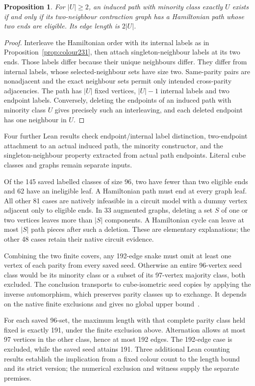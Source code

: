 \documentclass[11pt,a4paper]{article}
\newtheorem{proposition}[theorem]{Proposition}
\theoremstyle{definition}
\theoremstyle{remark}
\begin{document}
\begin{proposition}\label{prop:minority232}
For $|U|\ge2$, an induced path with minority class exactly $U$ exists if
and only if its two-neighbour contraction graph has a Hamiltonian path
whose two ends are eligible. Its edge length is $2|U|$.
\end{proposition}
\begin{proof}
Interleave the Hamiltonian order with its internal labels as in
Proposition~\ref{prop:colour231}, then attach singleton-neighbour labels
at its two ends. Those labels differ because their unique neighbours
differ. They differ from internal labels, whose selected-neighbour sets
have size two. Same-parity pairs are nonadjacent and the exact neighbour
sets permit only intended cross-parity adjacencies. The path has $|U|$
fixed vertices, $|U|-1$ internal labels and two endpoint labels.
Conversely, deleting the endpoints of an induced path with minority
class $U$ gives precisely such an interleaving, and each deleted endpoint
has one neighbour in $U$.
\end{proof}

Four further Lean results check endpoint/internal label distinction,
two-endpoint attachment to an actual induced path, the minority
constructor, and the singleton-neighbour property extracted from actual
path endpoints. Literal cube classes and graphs remain separate inputs.

Of the 145 saved labelled classes of size 96, two have fewer than two
eligible ends and 62 have an ineligible leaf. A Hamiltonian path must end
at every graph leaf. All other 81 cases are natively infeasible in a
circuit model with a dummy vertex adjacent only to eligible ends.
In 33 augmented graphs, deleting a set $S$ of one or two vertices leaves
more than $|S|$ components. A Hamiltonian cycle can leave at most $|S|$
path pieces after such a deletion. These are elementary explanations;
the other 48 cases retain their native circuit evidence.

Combining the two finite covers, any 192-edge snake must omit at least
one vertex of each parity from every saved seed. Otherwise an entire
96-vertex seed class would be its minority class or a subset of its
97-vertex majority class, both excluded. The conclusion transports to
cube-isometric seed copies by applying the inverse automorphism, which
preserves parity classes up to exchange. It depends on the native finite
exclusions and gives no global upper bound~\cite{research232}.

For each saved 96-set, the maximum length with that complete parity
class held fixed is exactly 191, under the finite exclusion above.
Alternation allows at most 97 vertices in the other class, hence at most
192 edges. The 192-edge case is excluded, while the saved seed attains
191. Three additional Lean counting results establish the implication
from a fixed colour count to the length bound and its strict version;
the numerical exclusion and witness supply the separate premises.
\end{document}
